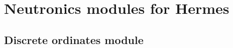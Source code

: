 \chapter{Neutronics modules for Hermes}\label{chap:hermes}

\section{Discrete ordinates module}\label{sec:DO}